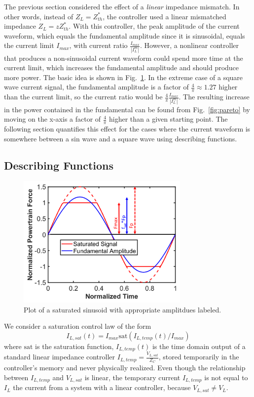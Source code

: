 \documentclass{ifacconf}
\begin{document}
The previous section considered the effect of a \textit{linear} impedance mismatch. In other words, instead of $Z_L = Z_{th}^*$, the controller used a linear mismatched impedance $Z_L = z Z_{th}^*$. With this controller, the peak amplitude of the current waveform, which equals the fundamental amplitude since it is sinusoidal, equals the current limit $I_{max}$, with current ratio $\frac{I_{max}}{|I_L^m|}$. However, a nonlinear controller that produces a non-sinusoidal current waveform could spend more time at the current limit, which increases the fundamental amplitude and should produce more power. The basic idea is shown in Fig.~\ref{fig:sat-sin}. In the extreme case of a square wave current signal, the fundamental amplitude is a factor of $\frac{4}{\pi}\approx 1.27 $ higher than the current limit, so the current ratio would be $\frac{4}{\pi}\frac{I_{max}}{|I_L^m|}$. The resulting increase in the power contained in the fundamental can be found from Fig.~\ref{fig:pareto} by moving on the x-axis a factor of $\frac{4}{\pi}$ higher than a given starting point. The following section quantifies this effect for the cases where the current waveform is somewhere between a sin wave and a square wave using describing functions.

\subsection{Describing Functions}
\begin{figure}
    \centering
    \includegraphics[width=8.4cm]{ifacconf_latex/figs/sin-saturation-3.png}
    \caption{Plot of a saturated sinusoid with appropriate amplitdues labeled.}
    \label{fig:sat-sin}
\end{figure}
We consider a saturation control law of the form
\begin{equation}
    I_{L,sat}(t) = I_{max}\textrm{sat}(I_{L,temp}(t)/I_{max})
\end{equation}
where $\textrm{sat}$ is the saturation function, $I_{L,temp}(t)$ is the time domain output of a standard linear impedance controller $I_{L,temp} = \frac{V_{L,sat}}{Z_C}$, stored temporarily in the controller's memory and never physically realized. Even though the relationship between $I_{L,temp}$ and $V_{L,sat}$ is linear, the temporary current $I_{L,temp}$ is not equal to $ I_L$ the current from a system with a linear controller, because $V_{L,sat} \neq V_L$. 
\end{document}
